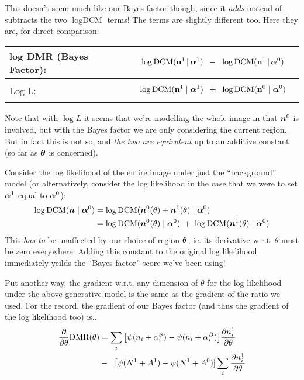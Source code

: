 \documentclass[12pt]{article}
\newcommand{\given}{\,|\,}
\renewcommand{\vec}[1]{\mathbf{#1}}
\newcommand{\balpha}{\mbox{\boldmath $\alpha$}}
\newcommand{\btheta}{\mbox{\boldmath $\theta$}}
\newcommand{\bn}{\mbox{\boldmath $n$}}
\newcommand{\DCM}{\mbox{DCM}}
\begin{document}
This doesn't seem much like our Bayes factor though, since it
\emph{adds} instead of subtracts the two $\log \DCM$ terms! The terms
are slightly different too.  Here they are, for direct comparison:

\begin{tabular}{|l|l|}
\hline
log DMR (Bayes Factor): & 
\parbox{.7\textwidth}{
\begin{align*}
&\log \DCM(\vec{n}^1 \given \balpha^1) \;\;-\;\; \log \DCM(\vec{n}^1 \given \balpha^0)
\end{align*}
} \\
\hline
Log L: & 
\parbox{.7\textwidth}{
\begin{align*}
& \log \DCM(\vec{n}^1 \mid \balpha^1) \;\; + \;\; \log \DCM(\vec{n}^0 \mid \balpha^0)
\end{align*}
} \\
\hline
\end{tabular}

Note that with $\log L$ it seems that we're modelling the whole image
in that $\bn^0$ is involved, but with the Bayes factor we are only
considering the current region. But in fact this is not so, and {\it
  the two are equivalent} up to an additive constant (so far as
$\btheta$ is concerned).

Consider the log likelihood of the entire image under just the
``background'' model (or alternatively, consider the log likelihood in the case that we were to set $\balpha^1$ equal to $\balpha^0$):
\begin{align*}
\log \DCM(\bn \mid \balpha^0) 
&= \log \DCM(\bn^0(\theta) + \bn^1(\theta) \mid \balpha^0)  \\
&= \log \DCM(\bn^0(\theta) \mid \balpha^0) \; + \; \log \DCM(\bn^1(\theta) \mid \balpha^0) 
\end{align*}
This \emph{has to} be unaffected by our choice of region $\btheta$,
ie. its derivative w.r.t. $\theta$ must be zero everywhere.  Adding
this constant to the original log likelihood immediately yeilds the
``Bayes factor'' score we've been using!

Put another way, the gradient w.r.t. any dimension of $\theta$ for the
log likelihood under the above generative model is the same as the
gradient of the ratio we used.  For the record, the gradient of our
Bayes factor (and thus the gradient of the log likelihood too) is...
\begin{align}
\frac{\partial}{\partial\theta}\text{DMR}(\theta) 
&= \sum_i \big[ \psi(n_i + \alpha^S_i) - \psi(n_i + \alpha^B_i) \big] \frac{\partial n^1_i}{\partial\theta} \notag\\
& - \;\; \big[\psi(N^1+A^1) - \psi(N^1+A^0)]\sum_i \frac{\partial n^1_i}{\partial\theta}
\end{align}
\end{document}
